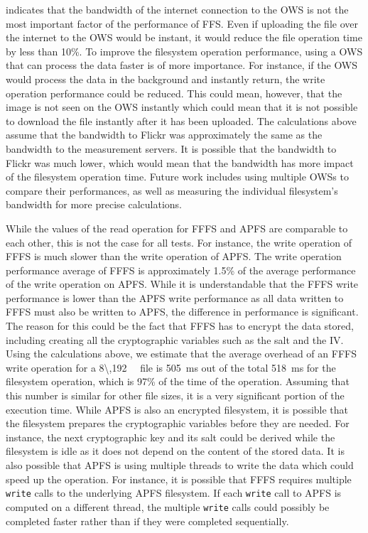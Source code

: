 indicates that the bandwidth of the internet connection to the \gls{OWS} is not the most important factor of the performance of \gls{FFS}. Even if uploading the file over the internet to the \gls{OWS} would be instant, it would reduce the file operation time by less than 10\%. To improve the filesystem operation performance, using a \gls{OWS} that can process the data faster is of more importance. For instance, if the \gls{OWS} would process the data in the background and instantly return, the write operation performance could be reduced. This could mean, however, that the image is not seen on the \gls{OWS} instantly which could mean that it is not possible to download the file instantly after it has been uploaded. The calculations above assume that the bandwidth to Flickr was approximately the same as the bandwidth to the measurement servers. It is possible that the bandwidth to Flickr was much lower, which would mean that the bandwidth has more impact of the filesystem operation time. Future work includes using multiple \gls{OWS}s to compare their performances, as well as measuring the individual filesystem's bandwidth for more precise calculations.

While the values of the read operation for \gls{FFFS} and \gls{APFS} are comparable to each other, this is not the case for all tests. For instance, the write operation of \gls{FFFS} is much slower than the write operation of \gls{APFS}. The write operation performance average of \gls{FFFS} is approximately 1.5\% of the average performance of the write operation on \gls{APFS}. While it is understandable that the \gls{FFFS} write performance is lower than the \gls{APFS} write performance as all data written to \gls{FFFS} must also be written to \gls{APFS}, the difference in performance is significant. The reason for this could be the fact that \gls{FFFS} has to encrypt the data stored, including creating all the cryptographic variables such as the salt and the \gls{IV}. Using the calculations above, we estimate that the average overhead of an \gls{FFFS} write operation for a \SI[per-mode = symbol]{8\,192}{\kilo\byte} file is \SI[per-mode = symbol]{505}{\milli\second} out of the total \SI{518}{\milli\second} for the filesystem operation, which is 97\% of the time of the operation. Assuming that this number is similar for other file sizes, it is a very significant portion of the execution time. While \gls{APFS} is also an encrypted filesystem, it is possible that the filesystem prepares the cryptographic variables before they are needed. For instance, the next cryptographic key and its salt could be derived while the filesystem is idle as it does not depend on the content of the stored data. It is also possible that \gls{APFS} is using multiple threads to write the data which could speed up the operation. For instance, it is possible that \gls{FFFS} requires multiple \texttt{write} calls to the underlying \gls{APFS} filesystem. If each \texttt{write} call to \gls{APFS} is computed on a different thread, the multiple \texttt{write} calls could possibly be completed faster rather than if they were completed sequentially.

